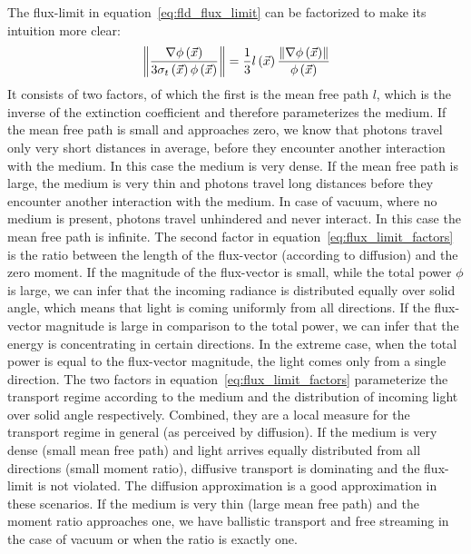 The flux-limit in equation~\ref{eq:fld_flux_limit} can be factorized to make its intuition more clear:
\begin{align}
\label{eq:flux_limit_factors}
\left\lVert
\frac{\nabla\phi\left(\vec{x}\right)}{3\sigma_t\left(\vec{x}\right)\phi\left(\vec{x}\right)}
\right\rVert
=
\frac{1}{3}
l\left(\vec{x}\right)
\frac{\left\lVert\nabla\phi\left(\vec{x}\right)\right\rVert}{\phi\left(\vec{x}\right)}
\end{align}
It consists of two factors, of which the first is the mean free path $l$, which is the inverse of the extinction coefficient and therefore parameterizes the medium. If the mean free path is small and approaches zero, we know that photons travel only very short distances in average, before they encounter another interaction with the medium. In this case the medium is very dense. If the mean free path is large, the medium is very thin and photons travel long distances before they encounter another interaction with the medium. In case of vacuum, where no medium is present, photons travel unhindered and never interact. In this case the mean free path is infinite.
The second factor in equation~\ref{eq:flux_limit_factors} is the ratio between the length of the flux-vector (according to diffusion) and the zero moment. If the magnitude of the flux-vector is small, while the total power $\phi$ is large, we can infer that the incoming radiance is distributed equally over solid angle, which means that light is coming uniformly from all directions. If the flux-vector magnitude is large in comparison to the total power, we can infer that the energy is concentrating in certain directions. In the extreme case, when the total power is equal to the flux-vector magnitude, the light comes only from a single direction.
The two factors in equation~\ref{eq:flux_limit_factors} parameterize the transport regime according to the medium and the distribution of incoming light over solid angle respectively. Combined, they are a local measure for the transport regime in general (as perceived by diffusion). If the medium is very dense (small mean free path) and light arrives equally distributed from all directions (small moment ratio), diffusive transport is dominating and the flux-limit is not violated. The diffusion approximation is a good approximation in these scenarios. If the medium is very thin (large mean free path) and the moment ratio approaches one, we have ballistic transport and free streaming in the case of vacuum or when the ratio is exactly one.

